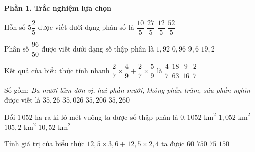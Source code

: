 \textbf{Phần 1. Trắc nghiệm lựa chọn}

\begin{ex} %
Hỗn số $5\dfrac{2}{5}$ được viết dưới dạng phân số là
\choice
{$\dfrac{10}{5}$}
{\True $\dfrac{27}{5}$}
{$\dfrac{12}{5}$}
{$\dfrac{52}{5}$}
\end{ex}

\begin{ex} %
Phân số $\dfrac{96}{50}$ được viết dưới dạng số thập phân là
\choice
{\True $1{,}92$}
{$0{,}96$}
{$9{,}6$}
{$19{,}2$}
\end{ex}

\begin{ex} %
Kết quả của biểu thức tính nhanh $\dfrac{2}{7} \times \dfrac{4}{9} + \dfrac{2}{7} \times \dfrac{5}{9}$ là
\choice
{$\dfrac{4}{7}$}
{$\dfrac{18}{63}$}
{$\dfrac{9}{16}$}
{\True $\dfrac{2}{7}$}
\end{ex}

\begin{ex} %
Số gồm: \textit{Ba mươi lăm đơn vị, hai phần mười, không phần trăm, sáu phần nghìn} được viết là
\choice
{$35{,}26$}
{$35{,}026$}
{\True $35{,}206$}
{$35{,}260$}
\end{ex}

\begin{ex} %
Đổi $1\,052\text{ ha}$ ra ki-lô-mét vuông ta được số thập phân là
\choice
{$0{,}1052\text{ km}^2$}
{$1{,}052\text{ km}^2$}
{$105{,}2\text{ km}^2$}
{\True $10{,}52\text{ km}^2$}
\end{ex}

\begin{ex} %
Tính giá trị của biểu thức $12{,}5 \times 3{,}6 + 12{,}5 \times 2{,}4$ ta được
\choice
{$60$}
{$750$}
{\True $75$}
{$150$}
\end{ex}

